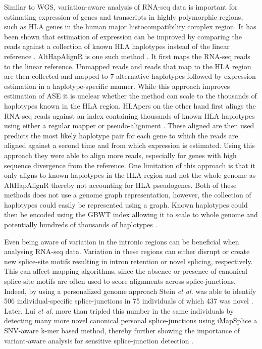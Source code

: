 Similar to WGS, variation-aware analysis of RNA-seq data is important for estimating expression of genes and transcripts in highly polymorphic regions, such as HLA genes in the human major histocompatibility complex region. 
It has been shown that estimation of expression can be improved by comparing the reads against a collection of known HLA haplotypes instead of the linear reference \cite{Lee2018-mm,Aguiar2019-fy}.
AltHapAlignR is one such method \cite{Lee2018-mm}. It first maps the RNA-seq reads to the linear reference. Unmapped reads and reads that map to the HLA region are then collected and mapped to 7 alternative haplotypes followed by expression estimation in a haplotype-specific manner. 
While this approach improves estimation of ASE it is unclear whether the method can scale to the thousands of haplotypes known in the HLA region.
HLApers on the other hand first alings the RNA-seq reads against an index containing thousands of known HLA haplotypes using either a regular mapper or pseudo-alignment \cite{Aguiar2019-fy}.
These aligned are then used predicts the most likely haplotype pair for each gene to which the reads are aligned against a second time and from which expression is estimated.  
Using this approach they were able to align more reads, especially for genes with high sequence divergence from the reference. 
One limitation of this approach is that it only aligns to known haplotypes in the HLA region and not the whole genome as AltHapAlignR thereby not accounting for HLA pseudogenes.
Both of these methods does not use a genome graph representation, however, the collection of haplotypes could easily be represented using a graph.
Known haplotypes could then be encoded using the GBWT index allowing it to scale to whole genome and potentially hundreds of thousands of haplotypes \cite{Siren_2019}. 

Even being aware of variation in the intronic regions can be beneficial when analysing RNA-seq data. 
Variation in these regions can either disrupt or create new splice-site motifs resulting in intron retention or novel splicing, respectively. 
This can affect mapping algorithms, since the absence or presence of canonical splice-site motifs are often used to score alignments across splice-junctions. 
Indeed, by using a personalized genome approach Stein \textit{et al.} was able to identify 506 individual-specific splice-junctions in 75 individuals of which 437 was novel \cite{Stein_2015}. 
Later, Lui \textit{et al.} more than tripled this number in the same individuals by detecting many more novel canonical personal splice-junctions using iMapSplice a SNV-aware k-mer based method, thereby further showing the importance of variant-aware analysis for sensitive splice-junction detection \cite{Liu_2018}. 




